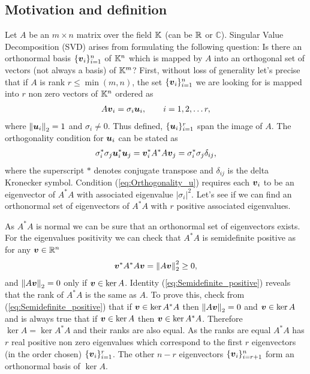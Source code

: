    \subsection*{Motivation and definition}
   Let $A$ be an $m\times n$ matrix over the field $\mathbb{K}^{}$ (can be $\mathbb{R}^{}$ or $\mathbb{C}$). Singular Value Decomposition (SVD) arises from 
   formulating the following question: Is there an orthonormal basis $\{\boldsymbol{v}_i\}_{i=1}^{n}$ of $\mathbb{K}^{n}$ which is mapped by $A$ into an 
   orthogonal set of vectors (not always a basis) of $\mathbb{K}^{m}$? First, without loss of generality let's precise that if $A$ is rank 
   $r\leq\min(m,n)$, the set $\{\boldsymbol{v}_i\}_{i=1}^{n}$ we are looking for is mapped into $r$ non zero vectors of $\mathbb{K}^{n}$ ordered as
   \begin{align}
   	A \boldsymbol{v}_i = \sigma_i \boldsymbol{u}_i, \qquad
   	i = 1,2,\ldots r,
   	\label{eq:SVD_origin}
   \end{align}
   where $\norm{\boldsymbol{u}_i}_2 = 1$ and $\sigma_i\neq 0$. Thus defined, $\{\boldsymbol{u}_i\}_{i=1}^{r}$ span the image of $A$. The orthogonality 
   condition for $\boldsymbol{u}_i$ can be stated as
   \begin{align}
   	\sigma_i^* \sigma_j \boldsymbol{u}_i^* 
   	 \boldsymbol{u}_j
   	=
      \boldsymbol{v}_i^*	A^* 
   	A \boldsymbol{v}_j
   	=
   	\sigma_i^* \sigma_j \delta_{ij},
   	\label{eq:Orthogonality_u}
   \end{align}
   where the superscript $*$ denotes conjugate transpose and $\delta_{ij}$ is the delta Kronecker symbol. Condition 
   (\ref{eq:Orthogonality_u}) requires each $\boldsymbol{v}_i$ to be an eigenvector of $A^* A$ with associated eigenvalue $|\sigma_i|^2$. Let's see 
   if we can find an orthonormal set of eigenvectors of $A^* A$ with $r$ positive associated eigenvalues.
   
   As $A^* A$ is normal we can be sure that an orthonormal set of eigenvectors exists. For the eigenvalues positivity we can check that $A^* 
   A$ is semidefinite positive as for any $\boldsymbol{v}\in\mathbb{R}^{n}$
   \begin{align}
   	\boldsymbol{v}^* A^* A \boldsymbol{v} = \norm{A\boldsymbol{v}}_2^2 \geq 0,
   	\label{eq:Semidefinite_positive}
   \end{align}
   and $\norm{A\boldsymbol{v}}_2 = 0$ only if $\boldsymbol{v}\in \ker A$. Identity (\ref{eq:Semidefinite_positive}) reveals that the rank of $A^* A$ is 
   the same as $A$. To prove this, check from (\ref{eq:Semidefinite_positive}) that if $\boldsymbol{v}\in \ker A^* A$ then $\norm{A\boldsymbol{v}}_2 = 0$ 
   and $\boldsymbol{v}\in \ker A$ and is always true that if $\boldsymbol{v}\in \ker A$ then $\boldsymbol{v}\in \ker A^* A$. Therefore $\ker A = \ker A^* A$ 
   and their ranks are also equal. As the ranks are equal $A^* A$ has $r$ real positive non zero eigenvalues which correspond to the first 
   $r$ eigenvectors (in the order chosen) $\{\boldsymbol{v}_i\}_{i=1}^{r}$. The other $n-r$ eigenvectors $\{\boldsymbol{v}_i\}_{i=r+1}^{n}$ form an 
   orthonormal basis of $\ker A$.
   
